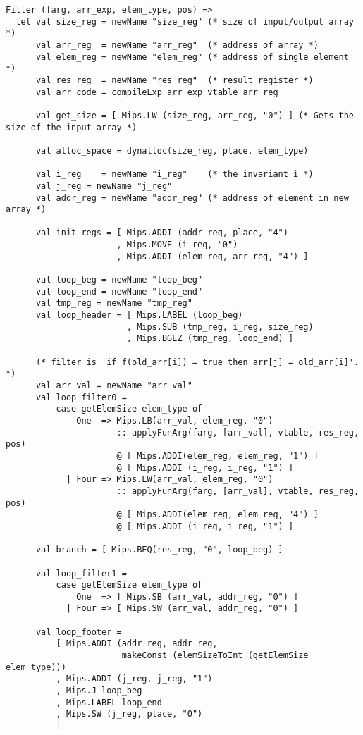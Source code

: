 \documentclass[12pt]{article}
\begin{document}
\begin{center}
\begin{center}
\begin{verbatim}
Filter (farg, arr_exp, elem_type, pos) =>
  let val size_reg = newName "size_reg" (* size of input/output array *)
      val arr_reg  = newName "arr_reg"  (* address of array *)
      val elem_reg = newName "elem_reg" (* address of single element *)
      val res_reg  = newName "res_reg"  (* result register *)
      val arr_code = compileExp arr_exp vtable arr_reg

      val get_size = [ Mips.LW (size_reg, arr_reg, "0") ] (* Gets the size of the input array *)
      
      val alloc_space = dynalloc(size_reg, place, elem_type)

      val i_reg    = newName "i_reg"    (* the invariant i *)
      val j_reg = newName "j_reg"
      val addr_reg = newName "addr_reg" (* address of element in new array *)

      val init_regs = [ Mips.ADDI (addr_reg, place, "4")
                      , Mips.MOVE (i_reg, "0")
                      , Mips.ADDI (elem_reg, arr_reg, "4") ]

      val loop_beg = newName "loop_beg"
      val loop_end = newName "loop_end"
      val tmp_reg = newName "tmp_reg"
      val loop_header = [ Mips.LABEL (loop_beg)
                        , Mips.SUB (tmp_reg, i_reg, size_reg)
                        , Mips.BGEZ (tmp_reg, loop_end) ]

      (* filter is 'if f(old_arr[i]) = true then arr[j] = old_arr[i]'. *)
      val arr_val = newName "arr_val"
      val loop_filter0 =
          case getElemSize elem_type of
              One  => Mips.LB(arr_val, elem_reg, "0")
                      :: applyFunArg(farg, [arr_val], vtable, res_reg, pos)
                      @ [ Mips.ADDI(elem_reg, elem_reg, "1") ]
                      @ [ Mips.ADDI (i_reg, i_reg, "1") ]
            | Four => Mips.LW(arr_val, elem_reg, "0")
                      :: applyFunArg(farg, [arr_val], vtable, res_reg, pos)
                      @ [ Mips.ADDI(elem_reg, elem_reg, "4") ]
                      @ [ Mips.ADDI (i_reg, i_reg, "1") ]

      val branch = [ Mips.BEQ(res_reg, "0", loop_beg) ]

      val loop_filter1 =
          case getElemSize elem_type of
              One  => [ Mips.SB (arr_val, addr_reg, "0") ]
            | Four => [ Mips.SW (arr_val, addr_reg, "0") ]

      val loop_footer =
          [ Mips.ADDI (addr_reg, addr_reg,
                       makeConst (elemSizeToInt (getElemSize elem_type)))
          , Mips.ADDI (j_reg, j_reg, "1")
          , Mips.J loop_beg
          , Mips.LABEL loop_end
          , Mips.SW (j_reg, place, "0")
          ]


\end{verbatim}
\end{center}
\end{center}
\end{document}
